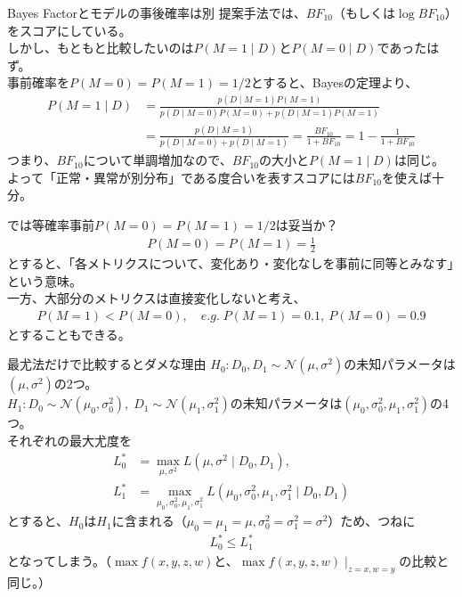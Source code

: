 \documentclass[dvipdfmx, 11pt, aspectratio=169, notheorems]{beamer}
\begin{document}
\begin{frame}{Bayes Factorとモデルの事後確率は別}
    提案手法では、$BF_{10}$（もしくは$\log{BF_{10}}$）をスコアにしている。\\
    しかし、もともと比較したいのは$P(M=1\mid D)$と$P(M=0\mid D)$であったはず。\\
    \vspace{12pt}
    事前確率を$P(M=0)=P(M=1)=1/2$とすると、Bayesの定理より、
    \begin{align}
        P(M=1\mid D) &= \frac{p(D \mid M=1)P(M=1)}{p(D \mid M=0)P(M=0)+ p(D \mid M=1)P(M=1)} \\
        &= \frac{p(D \mid M=1)}{p(D \mid M=0) + p(D \mid M=1)} = \frac{BF_{10}}{1 + BF_{10}} = 1 - \frac{1}{1 + BF_{10}}
    \end{align}
    つまり、$BF_{10}$について単調増加なので、$BF_{10}$の大小と$P(M=1\mid D)$は同じ。\\
    よって「正常・異常が別分布」である度合いを表すスコアには$BF_{10}$を使えば十分。
\end{frame}

\begin{frame}{では等確率事前$P(M=0)=P(M=1)=1/2$は妥当か？}
    \begin{align}
        P(M=0)=P(M=1)=\frac{1}{2}
    \end{align}    
    とすると、「各メトリクスについて、変化あり・変化なしを事前に同等とみなす」という意味。\\
    \vspace{12pt}
    一方、大部分のメトリクスは直接変化しないと考え、
    \begin{align}
        P(M=1) < P(M=0), \quad e.g. \; P(M=1) = 0.1, \ P(M=0) = 0.9
    \end{align}
    とすることもできる。
\end{frame}

\begin{frame}{最尤法だけで比較するとダメな理由}
    $H_0:D_0, D_1\sim \mathcal{N}(\mu, \sigma^2)$の未知パラメータは$(\mu, \sigma^2)$の2つ。\\
    $H_1:D_0\sim \mathcal{N}(\mu_0, \sigma_0^2),\; D_1\sim \mathcal{N}(\mu_1, \sigma_1^2)$の未知パラメータは$(\mu_0, \sigma_0^2, \mu_1, \sigma_1^2)$の4つ。\\
    それぞれの最大尤度を
    \begin{align}
        L_0^* &= \max_{\mu, \sigma^2} L(\mu, \sigma^2\mid D_0, D_1),\\
        L_1^* &= \max_{\mu_0, \sigma_0^2, \mu_1, \sigma_1^2} L(\mu_0, \sigma_0^2, \mu_1, \sigma_1^2\mid D_0, D_1)
    \end{align}
    とすると、$H_0$は$H_1$に含まれる（$\mu_0=\mu_1=\mu, \sigma_0^2=\sigma_1^2=\sigma^2$）ため、つねに
    \begin{align}
        L_0^* \leq L_1^*
    \end{align}
    となってしまう。{\scriptsize （$\max f(x, y, z, w)$と、$\max f(x, y, z, w)\mid_{z=x, w=y}$の比較と同じ。）}
\end{frame}
\end{document}
